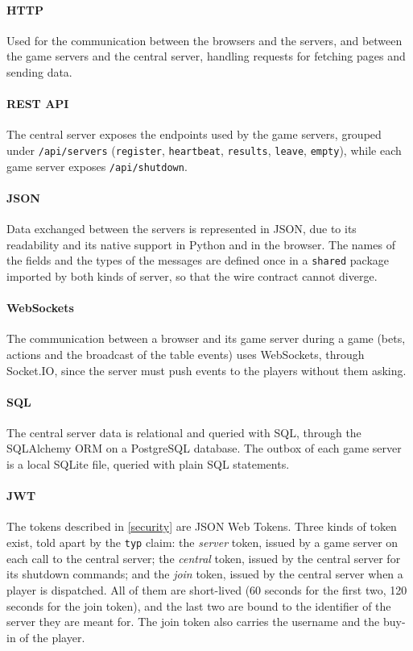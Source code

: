 \documentclass{scrartcl}
\begin{document}
\paragraph{HTTP}
Used for the communication between the browsers and the servers, and between the game servers and the central server, handling requests for fetching pages and sending data.

\paragraph{REST API}
The central server exposes the endpoints used by the game servers, grouped under \texttt{/api/servers} (\texttt{register}, \texttt{heartbeat}, \texttt{results}, 
\texttt{leave}, \texttt{empty}), while each game server exposes \texttt{/api/shutdown}.

\paragraph{JSON}
Data exchanged between the servers is represented in JSON, due to its readability and its native support in Python and in the browser.
The names of the fields and the types of the messages are defined once in a \texttt{shared} package imported by both 
kinds of server, so that the wire contract cannot diverge.

\paragraph{WebSockets}
The communication between a browser and its game server during a game (bets, actions and the broadcast of the table events) uses WebSockets, 
through Socket.IO, since the server must push events to the players without them asking.

\paragraph{SQL}
The central server data is relational and queried with SQL, through the SQLAlchemy ORM on a PostgreSQL database.
The outbox of each game server is a local SQLite file, queried with plain SQL statements.

\paragraph{JWT}
The tokens described in \cref{security} are JSON Web Tokens.
Three kinds of token exist, told apart by the \texttt{typ} claim: the \emph{server} token, issued by a game server on each call to the central server; 
the \emph{central} token, issued by the central server for its shutdown commands; and the \emph{join} token, issued by the central server when a player is dispatched.
All of them are short-lived (60 seconds for the first two, 120 seconds for the join token), and the last two are bound to the identifier of the server they are meant for.
The join token also carries the username and the buy-in of the player.
\end{document}
